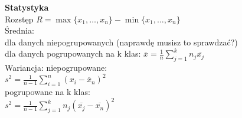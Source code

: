 \documentclass[10pt,landscape,a4paper,notitlepage]{article}
\begin{document}
\begin{multicols*}{4}
        \noindent\textbf{\large Statystyka}\\
        Rozstęp $R=\max\{x_1,\ldots,x_n\}-\min\{x_1,\ldots,x_n\}$\\
        Średnia:\\
        dla danych niepogrupowanych (naprawdę musisz to sprawdzać?)\\
        dla danych pogrupowanych na k klas: $\overline{x}=\frac{1}{n}\sum_{j=1}^kn_j\overline{x_j}$\\
        Wariancja: niepogrupowane:\\ $s^2=\frac{1}{n-1}\sum_{i=1}^n(x_i-\overline{x}_n)^2$\\
        pogrupowane na k klas:\\ $s^2=\frac{1}{n-1}\sum_{j=1}^kn_j(\overline{x_j}-\overline{x_n})^2$\\
    \end{multicols*}
\end{document}
